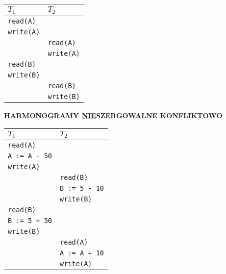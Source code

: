 \documentclass[a5paper,6pt]{article}
\begin{document}
    \begin{center}
    \begin{tabular}{|p{4cm}|p{4cm}|}
        \hline
        \textbf{$T_1$} & \textbf{$T_2$} \\
        \hline
        \texttt{read(A)} & \texttt{}\\
        \texttt{write(A)} & \texttt{}\\
        \texttt{} & \texttt{read(A)}\\
        \texttt{} & \texttt{write(A)}\\
        \texttt{read(B)} & \texttt{}\\
        \texttt{write(B)} & \texttt{}\\
        \texttt{} & \texttt{read(B)}\\
        \texttt{} & \texttt{write(B)}\\
        \hline
    \end{tabular}
    \end{center}

    \textbf{HARMONOGRAMY \underline{NIE}SZERGOWALNE KONFLIKTOWO}

    \begin{center}
    \begin{tabular}{|p{4cm}|p{4cm}|}
        \hline
        \textbf{$T_1$} & \textbf{$T_2$} \\
        \hline
        \texttt{read(A)} & \texttt{}\\
        \texttt{A := A - 50} & \texttt{}\\
        \texttt{write(A)} & \texttt{}\\
        \texttt{} & \texttt{read(B)}\\
        \texttt{} & \texttt{B := 5 - 10}\\
        \texttt{} & \texttt{write(B)}\\
        \texttt{read(B)} & \texttt{}\\
        \texttt{B := 5 + 50} & \texttt{}\\
        \texttt{write(B)} & \texttt{}\\
        \texttt{} & \texttt{read(A)}\\
        \texttt{} & \texttt{A := A + 10}\\
        \texttt{} & \texttt{write(A)}\\
        \hline
    \end{tabular}
    \end{center}

\pagebreak
\end{document}

